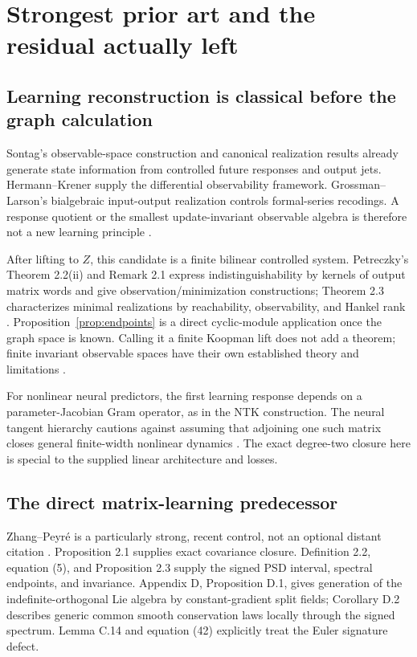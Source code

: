 \documentclass[11pt]{article}
\theoremstyle{remark}
\begin{document}
\section{Strongest prior art and the residual actually left}
\label{sec:sources}

\subsection{Learning reconstruction is classical before the graph calculation}

Sontag's observable-space construction and canonical realization results already generate state information from controlled future responses and output jets. Hermann--Krener supply the differential observability framework. Grossman--Larson's bialgebraic input-output realization controls formal-series recodings. A response quotient or the smallest update-invariant observable algebra is therefore not a new learning principle \cite{Sontag,HermannKrener,GrossmanLarson}.

After lifting to $Z$, this candidate is a finite bilinear controlled system. Petreczky's Theorem 2.2(ii) and Remark 2.1 express indistinguishability by kernels of output matrix words and give observation/minimization constructions; Theorem 2.3 characterizes minimal realizations by reachability, observability, and Hankel rank \cite{Petreczky}. Proposition~\ref{prop:endpoints} is a direct cyclic-module application once the graph space is known. Calling it a finite Koopman lift does not add a theorem; finite invariant observable spaces have their own established theory and limitations \cite{Koopman}.

For nonlinear neural predictors, the first learning response depends on a parameter-Jacobian Gram operator, as in the NTK construction. The neural tangent hierarchy cautions against assuming that adjoining one such matrix closes general finite-width nonlinear dynamics \cite{NTK,NTH}. The exact degree-two closure here is special to the supplied linear architecture and losses.

\subsection{The direct matrix-learning predecessor}

Zhang--Peyr\'e is a particularly strong, recent control, not an optional distant citation \cite{ZhangPeyre}. Proposition 2.1 supplies exact covariance closure. Definition 2.2, equation (5), and Proposition 2.3 supply the signed PSD interval, spectral endpoints, and invariance. Appendix D, Proposition D.1, gives generation of the indefinite-orthogonal Lie algebra by constant-gradient split fields; Corollary D.2 describes generic common smooth conservation laws locally through the signed spectrum. Lemma C.14 and equation (42) explicitly treat the Euler signature defect.
\end{document}
